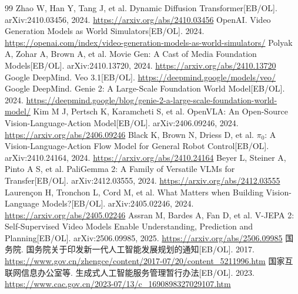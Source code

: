 \documentclass[UTF8,a4paper,12pt]{ctexart}
\begin{document}
\begin{thebibliography}{99}
 Zhao W, Han Y, Tang J, et al. Dynamic Diffusion Transformer[EB/OL]. arXiv:2410.03456, 2024. \url{https://arxiv.org/abs/2410.03456}
 OpenAI. Video Generation Models as World Simulators[EB/OL]. 2024. \url{https://openai.com/index/video-generation-models-as-world-simulators/}
 Polyak A, Zohar A, Brown A, et al. Movie Gen: A Cast of Media Foundation Models[EB/OL]. arXiv:2410.13720, 2024. \url{https://arxiv.org/abs/2410.13720}
 Google DeepMind. Veo 3.1[EB/OL]. \url{https://deepmind.google/models/veo/}
 Google DeepMind. Genie 2: A Large-Scale Foundation World Model[EB/OL]. 2024. \url{https://deepmind.google/blog/genie-2-a-large-scale-foundation-world-model/}
 Kim M J, Pertsch K, Karamcheti S, et al. OpenVLA: An Open-Source Vision-Language-Action Model[EB/OL]. arXiv:2406.09246, 2024. \url{https://arxiv.org/abs/2406.09246}
 Black K, Brown N, Driess D, et al. $\pi_0$: A Vision-Language-Action Flow Model for General Robot Control[EB/OL]. arXiv:2410.24164, 2024. \url{https://arxiv.org/abs/2410.24164}
 Beyer L, Steiner A, Pinto A S, et al. PaliGemma 2: A Family of Versatile VLMs for Transfer[EB/OL]. arXiv:2412.03555, 2024. \url{https://arxiv.org/abs/2412.03555}
 Lauren{\c c}on H, Tronchon L, Cord M, et al. What Matters when Building Vision-Language Models?[EB/OL]. arXiv:2405.02246, 2024. \url{https://arxiv.org/abs/2405.02246}
 Assran M, Bardes A, Fan D, et al. V-JEPA 2: Self-Supervised Video Models Enable Understanding, Prediction and Planning[EB/OL]. arXiv:2506.09985, 2025. \url{https://arxiv.org/abs/2506.09985}
 国务院. 国务院关于印发新一代人工智能发展规划的通知[EB/OL]. 2017. \url{https://www.gov.cn/zhengce/content/2017-07/20/content_5211996.htm}
 国家互联网信息办公室等. 生成式人工智能服务管理暂行办法[EB/OL]. 2023. \url{https://www.cac.gov.cn/2023-07/13/c_1690898327029107.htm}
\end{thebibliography}
\end{document}

